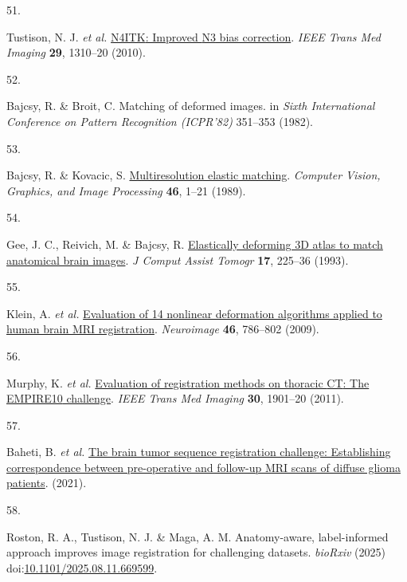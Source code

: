 \documentclass[
  12pt,
]{article}
\newlength{\cslhangindent}
\newlength{\csllabelwidth}
\newenvironment{CSLReferences}[2] %
 {\begin{list}{}{%
  \setlength{\itemindent}{0pt}
  \setlength{\leftmargin}{0pt}
  \setlength{\parsep}{0pt}
  \ifodd #1
   \setlength{\leftmargin}{\cslhangindent}
   \setlength{\itemindent}{-1\cslhangindent}
  \fi
  \setlength{\itemsep}{#2\baselineskip}}}
 {\end{list}}
\newcommand{\CSLLeftMargin}[1]{\parbox[t]{\csllabelwidth}{\strut#1\strut}}
\newcommand{\CSLRightInline}[1]{\parbox[t]{\linewidth - \csllabelwidth}{\strut#1\strut}}
\begin{document}
\begin{CSLReferences}{0}{0}
\CSLLeftMargin{51. }%
\CSLRightInline{Tustison, N. J. \emph{et al.}
\href{https://doi.org/10.1109/TMI.2010.2046908}{{N4ITK}: Improved {N3}
bias correction}. \emph{IEEE Trans Med Imaging} \textbf{29}, 1310--20
(2010).}

\CSLLeftMargin{52. }%
\CSLRightInline{Bajcsy, R. \& Broit, C. Matching of deformed images. in
\emph{{S}ixth {I}nternational {C}onference on {P}attern {R}ecognition
({ICPR}'82)} 351--353 (1982).}

\CSLLeftMargin{53. }%
\CSLRightInline{Bajcsy, R. \& Kovacic, S.
\href{https://doi.org/10.1016/S0734-189X(89)80014-3}{Multiresolution
elastic matching}. \emph{Computer Vision, Graphics, and Image
Processing} \textbf{46}, 1--21 (1989).}

\CSLLeftMargin{54. }%
\CSLRightInline{Gee, J. C., Reivich, M. \& Bajcsy, R.
\href{https://doi.org/10.1097/00004728-199303000-00011}{Elastically
deforming 3D atlas to match anatomical brain images}. \emph{J Comput
Assist Tomogr} \textbf{17}, 225--36 (1993).}

\CSLLeftMargin{55. }%
\CSLRightInline{Klein, A. \emph{et al.}
\href{https://doi.org/10.1016/j.neuroimage.2008.12.037}{Evaluation of 14
nonlinear deformation algorithms applied to human brain MRI
registration}. \emph{Neuroimage} \textbf{46}, 786--802 (2009).}

\CSLLeftMargin{56. }%
\CSLRightInline{Murphy, K. \emph{et al.}
\href{https://doi.org/10.1109/TMI.2011.2158349}{Evaluation of
registration methods on thoracic {CT}: The {EMPIRE10} challenge}.
\emph{IEEE Trans Med Imaging} \textbf{30}, 1901--20 (2011).}

\CSLLeftMargin{57. }%
\CSLRightInline{Baheti, B. \emph{et al.}
\href{https://arxiv.org/abs/2112.06979}{The brain tumor sequence
registration challenge: Establishing correspondence between
pre-operative and follow-up MRI scans of diffuse glioma patients}.
(2021).}

\CSLLeftMargin{58. }%
\CSLRightInline{Roston, R. A., Tustison, N. J. \& Maga, A. M.
Anatomy-aware, label-informed approach improves image registration for
challenging datasets. \emph{bioRxiv} (2025)
doi:\href{https://doi.org/10.1101/2025.08.11.669599}{10.1101/2025.08.11.669599}.}


\end{CSLReferences}
\end{document}
